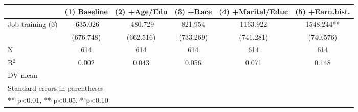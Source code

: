 \begin{table}[htbp]
\centering
\begin{tabular}{lccccc}
\hline\hline
 & (1) Baseline & (2) +Age/Edu & (3) +Race & (4) +Marital/Educ & (5) +Earn.hist. \\
\hline
Job training (β̂) & -635.026 & -480.729 & 821.954 & 1163.922 & 1548.244** \\
 & (676.748) & (662.516) & (733.269) & (741.281) & (740.576) \\
\hline
N & 614 & 614 & 614 & 614 & 614 \\
R$^2$ & 0.002 & 0.043 & 0.056 & 0.071 & 0.148 \\
DV mean &  &  &  &  &  \\
\hline\hline
\multicolumn{6}{l}{\footnotesize Standard errors in parentheses} \\
\multicolumn{6}{l}{\footnotesize *** p<0.01, ** p<0.05, * p<0.10} \\
\end{tabular}
\end{table}